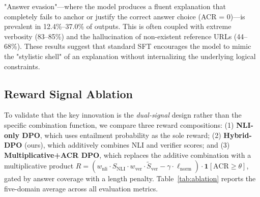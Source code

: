"Answer evasion"---where the model produces a fluent explanation that completely fails to anchor or justify the correct answer choice (ACR = 0)---is prevalent in 12.4\%--37.0\% of outputs. This is often coupled with extreme verbosity (83--85\%) and the hallucination of non-existent reference URLs (44--68\%). These results suggest that standard SFT encourages the model to mimic the "stylistic shell" of an explanation without internalizing the underlying logical constraints.

\begin{table}[h]
\centering
\caption{SFT Failure Mode Analysis across five domains. Percentages represent the proportion of SFT outputs affected by each failure mode. Answer Evasion is defined as zero coverage of ground-truth answer keywords (ACR=0).}
\label{tab:failure_modes}
\end{table}

\subsection{Reward Signal Ablation}
\label{sec:ablation}

To validate that the key innovation is the \textit{dual-signal} design rather than the specific combination function, we compare three reward compositions: (1) \textbf{NLI-only DPO}, which uses entailment probability as the sole reward; (2) \textbf{Hybrid-DPO} (ours), which additively combines NLI and verifier scores; and (3) \textbf{Multiplicative+ACR DPO}, which replaces the additive combination with a multiplicative product $R = (w_\text{nli} \cdot S_\text{NLI} \cdot w_\text{ver} \cdot \tilde{S}_\text{ver} - \gamma \cdot \ell_\text{norm}) \cdot \mathbf{1}[\text{ACR} \geq \theta]$, gated by answer coverage with a length penalty. Table~\ref{tab:ablation} reports the five-domain average across all evaluation metrics.

